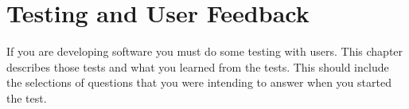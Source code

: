 \chapter{Testing and User Feedback}
\label{chap:testing}
If you are developing software you must do some testing with users.  This chapter describes those tests and what you learned from the tests.  This should include the selections of questions that you were intending to answer when you started the test.  

